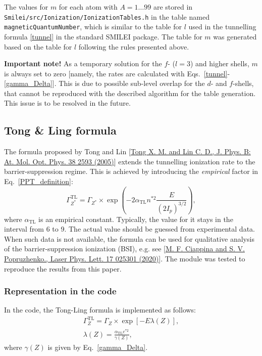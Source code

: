 \documentclass[prd, preprint,
aps,
amsmath,
amssymb,
onecolumn,
nofootinbib,
superscriptaddress,
]{revtex4-2}
\begin{document}
	The values for $m$ for each atom with $A=1\ldots99$ are stored in \texttt{Smilei/src/Ionization/IonizationTables.h} in the table named \texttt{magneticQuantumNumber}, which is similar to the table for $l$ used in the tunnelling formula \eqref{tunnel} in the standard SMILEI package. The table for $m$ was generated based on the table for $l$ following the rules presented above.
	
	\textbf{Important note!} As a temporary solution for the $f$- ($l=3$) and higher shells, $m$ is always set to zero [namely, the rates are calculated with Eqs.~\eqref{tunnel}-\eqref{gamma_Delta}]. This is due to possible sub-level overlap for the $d$- and $f$-shells, that cannot be reproduced with the described algorithm for the table generation. This issue is to be resolved in the future.
	
	
	\clearpage
	\subsection{Tong \& Ling formula}
	The formula proposed by Tong and Lin [\href{https://iopscience.iop.org/article/10.1088/0953-4075/38/15/001}{Tong X. M. and Lin C. D., J. Phys. B: At. Mol. Opt. Phys. 38 2593 (2005)}] extends the tunnelling ionization rate to the barrier-suppression regime. This is achieved by introducing the \textit{empirical} factor in Eq.~\eqref{PPT_definition}:
	\begin{equation}
		\Gamma_{Z^*}^{\text{TL}} = \Gamma_{Z^*}\times \exp\left( -2\alpha_{\text{TL}} n^{*2} \frac{E}{(2 I_p)^{3/2}}\right),
	\end{equation}
	where $\alpha_{\text{TL}}$ is an empirical constant. Typically, the value for it stays in the interval from 6 to 9. The actual value should be guessed from experimental data. When such data is not available, the formula can be used for qualitative analysis of the barrier-suppression ionization (BSI), e.g. see [\href{https://iopscience.iop.org/article/10.1088/1612-202X/ab6559}{M. F. Ciappina and S. V. Popruzhenko., Laser Phys. Lett. 17 025301 (2020)}]. The module was tested to reproduce the results from this paper.
	
	\subsubsection{Representation in the code}
	In the code, the Tong-Ling formula is implemented as follows:
	\begin{gather}
		\label{tonglin}
		\Gamma_{Z}^\text{TL}=\Gamma_{Z}\times \exp\left[ -E\lambda(Z) \right] ,\\
		\lambda(Z) = \frac{\alpha_{\text{TL}} c^{*2}}{\gamma(Z)},
	\end{gather}
	where $\gamma(Z)$ is given by Eq.~\eqref{gamma_Delta}.
	
\end{document}
